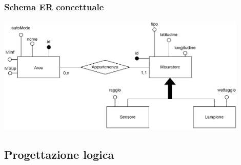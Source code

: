 \subsubsection{Schema ER concettuale}

\begin{center}
    \includegraphics[width=12cm]{contenuti/specifica-basi-dati/img-sbd/anagrafica_concettuale.png}
\end{center}

\subsection{Progettazione logica}
